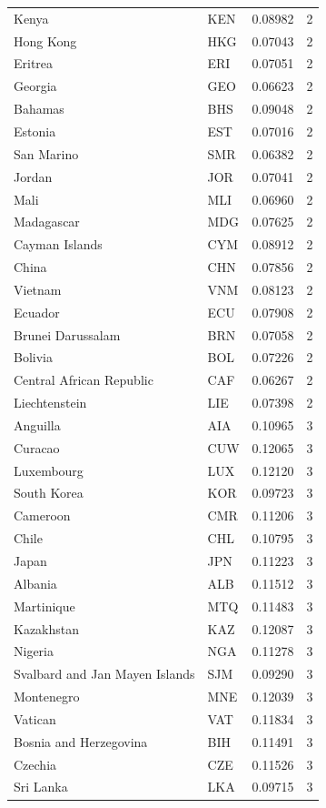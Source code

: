 \begin{table}[htbp]
\begin{tabular}{llcc}
Kenya & KEN &  0.08982 & 2 \\
Hong Kong & HKG &  0.07043 & 2 \\
Eritrea & ERI &  0.07051 & 2 \\
Georgia & GEO &  0.06623 & 2 \\
Bahamas & BHS &  0.09048 & 2 \\
Estonia & EST &  0.07016 & 2 \\
San Marino & SMR &  0.06382 & 2 \\
Jordan & JOR &  0.07041 & 2 \\
Mali & MLI &  0.06960 & 2 \\
Madagascar & MDG &  0.07625 & 2 \\
Cayman Islands & CYM &  0.08912 & 2 \\
China & CHN &  0.07856 & 2 \\
Vietnam & VNM &  0.08123 & 2 \\
Ecuador & ECU &  0.07908 & 2 \\
Brunei Darussalam & BRN &  0.07058 & 2 \\
Bolivia & BOL &  0.07226 & 2 \\
Central African Republic & CAF &  0.06267 & 2 \\
Liechtenstein & LIE &  0.07398 & 2 \\
Anguilla & AIA &  0.10965 & 3 \\
Curacao & CUW &  0.12065 & 3 \\
Luxembourg & LUX &  0.12120 & 3 \\
South Korea & KOR &  0.09723 & 3 \\
Cameroon & CMR &  0.11206 & 3 \\
Chile & CHL &  0.10795 & 3 \\
Japan & JPN &  0.11223 & 3 \\
Albania & ALB &  0.11512 & 3 \\
Martinique & MTQ &  0.11483 & 3 \\
Kazakhstan & KAZ &  0.12087 & 3 \\
Nigeria & NGA &  0.11278 & 3 \\
Svalbard and Jan Mayen Islands & SJM &  0.09290 & 3 \\
Montenegro & MNE &  0.12039 & 3 \\
Vatican & VAT &  0.11834 & 3 \\
Bosnia and Herzegovina & BIH &  0.11491 & 3 \\
Czechia & CZE &  0.11526 & 3 \\
Sri Lanka & LKA &  0.09715 & 3 \\

\end{tabular}
\end{table}
